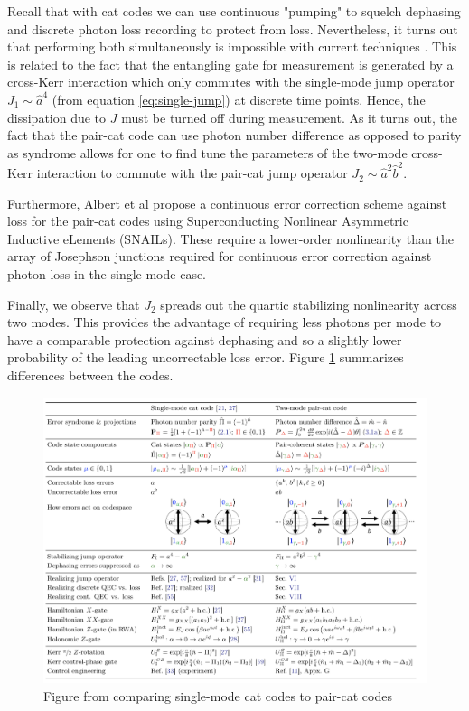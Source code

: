 \documentclass[12]{amsart}
\newcommand\0{\mathbf{0}}
\newcommand\<{\langle}
\renewcommand\>{\rangle}
\begin{document}
Recall that with cat codes we can use continuous "pumping" to squelch dephasing and discrete photon loss recording to protect from loss. Nevertheless, it turns out that performing both simultaneously is impossible with current techniques \cite{albert2018multimode}. This is related to the fact that the entangling gate for measurement is generated by a cross-Kerr interaction which only commutes with the single-mode jump operator $J_1 \sim \hat{a}^4$ (from equation \ref{eq:single-jump}) at discrete time points. Hence, the dissipation due to $J$ must be turned off during measurement. As it turns out, the fact that the pair-cat code can use photon number difference as opposed to parity as syndrome allows for one to find tune the parameters of the two-mode cross-Kerr interaction to commute with the pair-cat jump operator $J_2 \sim \hat{a}^2\hat{b}^2$.

Furthermore, Albert et al propose a continuous error correction scheme against loss for the pair-cat codes using Superconducting Nonlinear Asymmetric Inductive eLements (SNAILs)\cite{frattini20173}. These require a lower-order nonlinearity than the array of Josephson junctions required for continuous error correction against photon loss in the single-mode case.

Finally, we observe that $J_2$ spreads out the quartic stabilizing nonlinearity across two modes. This provides the advantage of requiring less photons per mode to have a comparable protection against dephasing and so a slightly lower probability of the leading uncorrectable loss error. Figure \ref{fig:cat} summarizes differences between the codes.

\begin{figure}[h]
\label{fig:cat}
\centering
\includegraphics[width=\linewidth,keepaspectratio]{pair_cat.png}	
\caption{Figure from \cite{albert2018multimode} comparing single-mode cat codes to pair-cat codes}
\end{figure}
\end{document}

